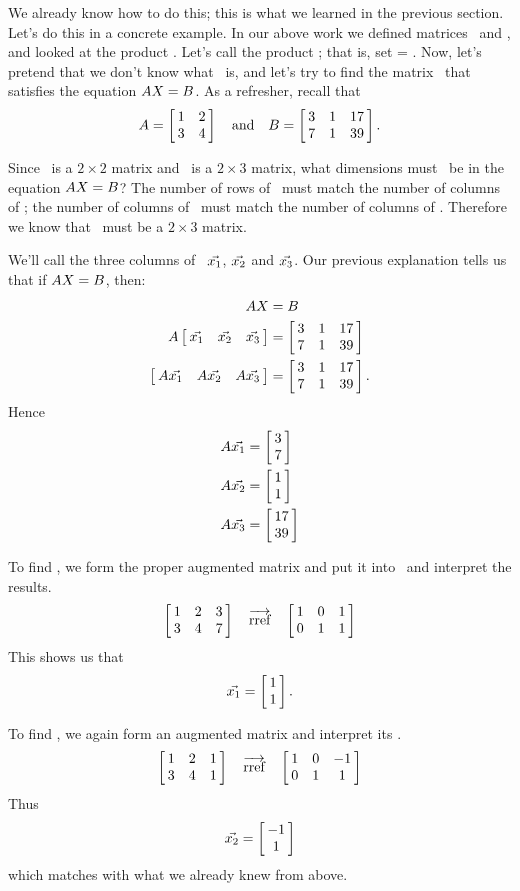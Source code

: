 We already know how to do this; this is what we learned in the previous section. Let's do this in a concrete example. In our above work we defined matrices \tta\ and \ttx, and looked at the product \tta\ttx. Let's call the product \ttb; that is, set \ttb = \tta\ttx. Now, let's pretend that we don't know what \ttx\ is, and let's try to find the matrix \ttx\ that satisfies the equation $\tta\ttx=\ttb$. As a refresher, recall that $$\tta = \bmx{cc}1&2\\3&4\emx \quad \text{and} \quad \ttb = \bmx{ccc}3&1&17\\7&1&39\emx.$$

Since \tta\ is a $2\times 2$ matrix and \ttb\ is a $2\times 3$ matrix, what dimensions must \ttx\ be in the equation $\tta\ttx=\ttb$? The number of rows of \ttx\ must match the number of columns of \tta; the number of columns of \ttx\ must match the number of columns of \ttb. Therefore we know that \ttx\ must be a $2\times 3$ matrix.

We'll call the three columns of \ttx\ $\vect{x_1}$, $\vect{x_2}$ and $\vect{x_3}$. Our previous explanation tells us that if $\tta\ttx = \ttb$, then:
\begin{align*}
\tta\ttx & = \ttb\\
\tta\bmx{ccc}\vect{x_1} & \vect{x_2} & \vect{x_3}\emx & = \bmx{ccc}3&1&17\\7&1&39\emx \\
\bmx{ccc}\tta\vect{x_1} & \tta\vect{x_2} & \tta\vect{x_3}\emx & =\bmx{ccc}3&1&17\\7&1&39\emx. 
\end{align*}
Hence
\begin{align*}
\tta\vect{x_1} & = \bmx{c}3\\7\emx\\
\tta\vect{x_2} & = \bmx{c}1\\1\emx\\
\tta\vect{x_3} & = \bmx{c}17\\39\emx\\
\end{align*}

To find , we form the proper augmented matrix and put it into \rref\ and interpret the results. $$\bmx{ccc}1&2&3\\3&4&7\emx \quad \arref \quad \bmx{ccc}1&0&1\\0&1&1\emx$$
This shows us that $$\vect{x_1} = \bmx{c}1\\1\emx.$$

To find , we again form an augmented matrix and interpret its \rref. $$\bmx{ccc}1&2&1\\3&4&1\emx \quad \arref \quad \bmx{ccc}1&0&-1\\0&1&1\emx$$
Thus $$\vect{x_2} = \bmx{c}-1\\1\emx$$ which matches with what we already knew from above.

